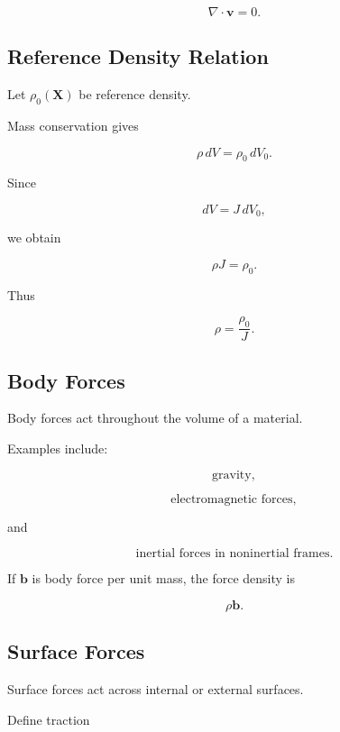 \[
\boxed{
\nabla\cdot\mathbf{v}=0.
}
\]

\subsection{Reference Density Relation}
\label{subsec:reference-density-relation}

Let \(\rho_0(\mathbf{X})\) be reference density.

Mass conservation gives

\[
\rho\,dV
=
\rho_0\,dV_0.
\]

Since

\[
dV
=
J\,dV_0,
\]

we obtain

\[
\boxed{
\rho J
=
\rho_0.
}
\]

Thus

\[
\boxed{
\rho
=
\frac{\rho_0}{J}.
}
\]

\subsection{Body Forces}
\label{subsec:body-forces}

Body forces act throughout the volume of a material.

Examples include:

\[
\boxed{
\text{gravity},
}
\]

\[
\boxed{
\text{electromagnetic forces},
}
\]

and

\[
\boxed{
\text{inertial forces in noninertial frames}.
}
\]

If \(\mathbf{b}\) is body force per unit mass, the force density is

\[
\boxed{
\rho\mathbf{b}.
}
\]

\subsection{Surface Forces}
\label{subsec:surface-forces}

Surface forces act across internal or external surfaces.

Define traction

